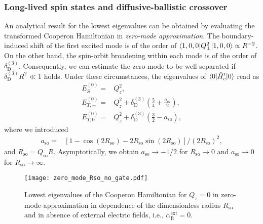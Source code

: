 \documentclass[superscriptaddress,noshowpacs,noshowkeys, twocolumn, floatfix,aps, prb,reprint]{revtex4-1}
\begin{document}
\subsubsection{Long-lived spin states and diffusive-ballistic crossover}


An analytical result for the lowest eigenvalues can be obtained by evaluating the transformed Cooperon Hamiltonian in \textit{zero-mode approximation}.
The boundary-induced shift of the first excited mode is of the order of $\braket{1,0,0|Q_\perp^2|1,0,0}\propto R^{-2}$.
On the other hand, the spin-orbit broadening within each mode is of the order of $\delta_\text{D}^{(3)}$.
Consequently, we can estimate the zero-mode to be well separated if $\delta_\text{D}^{(3)}R^2\ll 1$ holds.
Under these circumstances, the eigenvalues of $\braket{0|\hat{H}_c'|0}$ read as
%
\begin{align}
E_S^{(0)}={}&Q_z^2,\label{eigenvalue1}\\
E^{(0)}_{T,\pm}={}&Q_z^2+\delta_\text{D}^{(3)}\left(\frac{5}{4}+\frac{a_\text{so}}{2}\right),\label{eigenvalue2}\\
E^{(0)}_{T,0}={}&Q_z^2+\delta_\text{D}^{(3)}\left(\frac{3}{2}-a_\text{so}\right),\label{eigenvalue3}
\end{align}
%
where we introduced 
%
\begin{align}
a_\text{so}={}&\left[1-\cos(2R_\text{so})-2 R_\text{so}\sin( 2 R_\text{so})\right]/ (2R_\text{so})^2,
\end{align}
%
and $R_\text{so}=Q_\text{so}R$. 
Asymptotically, we obtain $a_\text{so}\rightarrow -1/2$ for $R_\text{so}\rightarrow 0$ and $a_\text{so}\rightarrow 0$ for $R_\text{so}\rightarrow \infty$.
%
\begin{figure}[t]
\texttt{[image: zero\_mode\_Rso\_no\_gate.pdf]}
\caption{Lowest eigenvalues of the Cooperon Hamiltonian for $Q_z=0$ in zero-mode-approximation in dependence of the dimensionless radius $R_\text{so}$ and in absence of external electric fields, i.e., $\alpha_\text{R}^\text{ext}=0$.}
\label{fig:zero_mode_spec}
\end{figure}
\end{document}
